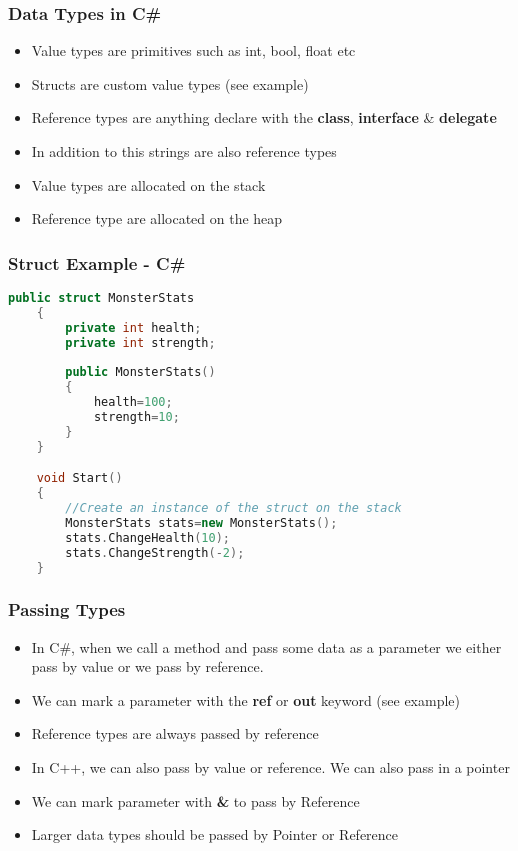\begin{frame}
\frametitle{Data Types in C\#}
\begin{itemize}
	\item Value types are primitives such as int, bool, float etc
	\item Structs are custom value types (see example)
	\item Reference types are anything declare with the \textbf{class}, \textbf{interface} \& \textbf{delegate}
	\item In addition to this strings are also reference types
	\item Value types are allocated on the stack
	\item Reference type are allocated on the heap
\end{itemize}
\end{frame}

\begin{frame}[fragile]
\frametitle{Struct Example - C\#}
\begin{lstlisting}[language=C++,basicstyle=\tiny,]
	public struct MonsterStats
	{
		private int health;
		private int strength;
		
		public MonsterStats()
		{
			health=100;
			strength=10;
		}
	}

	void Start()
	{		
		//Create an instance of the struct on the stack
		MonsterStats stats=new MonsterStats();
		stats.ChangeHealth(10);
		stats.ChangeStrength(-2);
	}	
\end{lstlisting}
\end{frame}

\begin{frame}
\frametitle{Passing Types}
\begin{itemize}
\item In C\#, when we call a method and pass some data as a parameter we either pass by value or we pass by reference. 
\item We can mark a parameter with the \textbf{ref} or \textbf{out} keyword (see example)
\item Reference types are always passed by reference
\item In C++, we can also pass by value or reference. We can also pass in a pointer
\item We can mark parameter with \textbf{\&} to pass by Reference 
\item Larger data types should be passed by Pointer or Reference
\end{itemize}
\end{frame}

